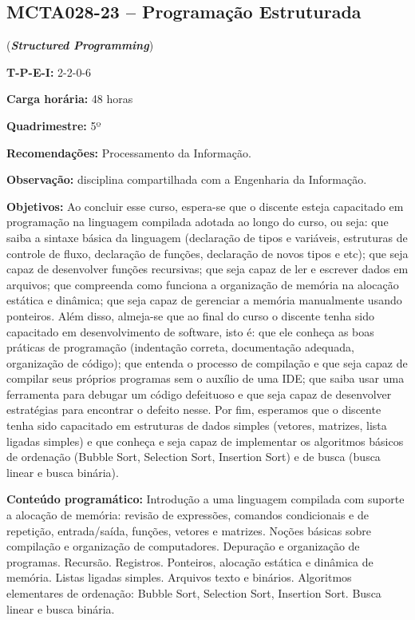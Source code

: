 \documentclass[class=article, crop=false]{standalone}
\begin{document}
\subsection*{MCTA028-23 -- Programação Estruturada}
\label{disc:pe}

(\textbf{\textit{Structured Programming}})

\begin{center}
    \begin{minipage}{0.85\textwidth}
        \textbf{T-P-E-I:} 2-2-0-6
        
        \textbf{Carga horária:} 48 horas
        
        \textbf{Quadrimestre:} 5º
        
        \textbf{Recomendações:} 
        Processamento da Informação.
        
        \textbf{Observação:} disciplina compartilhada com a Engenharia da Informação.
    \end{minipage}
\end{center}

\textbf{Objetivos:}
Ao concluir esse curso, espera-se que o discente esteja capacitado em
programação na linguagem compilada adotada ao longo do curso, ou seja: que
saiba a sintaxe básica da linguagem (declaração de tipos e variáveis,
estruturas de controle de fluxo, declaração de funções, declaração de novos
tipos e etc); que seja capaz de desenvolver funções recursivas; que seja capaz
de ler e escrever dados em arquivos; que compreenda como funciona a organização
de memória na alocação estática e dinâmica; que seja capaz de gerenciar a
memória manualmente usando ponteiros. 
Além disso, almeja-se que ao final do curso o discente tenha sido capacitado em
desenvolvimento de software, isto é: que ele conheça as boas práticas de
programação (indentação correta, documentação adequada, organização de código);
que entenda o processo de compilação e que seja capaz de compilar seus próprios
programas sem o auxílio de uma IDE; que saiba usar uma ferramenta para debugar
um código defeituoso e que seja capaz de desenvolver estratégias para encontrar
o defeito nesse.
Por fim, esperamos que o discente tenha sido capacitado em estruturas de dados
simples (vetores, matrizes, lista ligadas simples) e que conheça e seja capaz
de implementar os algoritmos básicos de ordenação (Bubble Sort, Selection Sort,
Insertion Sort) e de busca (busca linear e busca binária).

\textbf{Conteúdo programático:}
Introdução a uma linguagem compilada com suporte a alocação de memória: revisão 
de expressões, comandos condicionais e de repetição, entrada/saída, funções, 
vetores e matrizes.
Noções básicas sobre compilação e organização de computadores.
Depuração e organização de programas.
Recursão.
Registros.
Ponteiros, alocação estática e dinâmica de memória.
Listas ligadas simples.
Arquivos texto e binários.
Algoritmos elementares de ordenação: Bubble Sort, Selection Sort, Insertion Sort.
Busca linear e busca binária.
\end{document}

